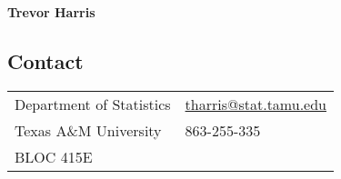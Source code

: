\documentclass[11pt]{article}
\title{\vspace{-0.9in}}
\author{\LARGE \textbf{Trevor Harris}}
\begin{document}
\thispagestyle{empty}

\begin{center}
{\LARGE \textbf{Trevor Harris}}
\end{center}

\subsection*{Contact}
\vspace{-0.6cm}\noindent\hrulefill
\vspace{-0.2cm}

\begin{table}[H]
\hspace{-3.7mm}
\begin{tabular}{ll}
Department of Statistics  &  \hspace{8cm} \href{mailto:tharris@stat.tamu.edu}{\color{blue} {tharris@stat.tamu.edu}} \\

Texas A\&M University   &  \hspace{8cm}  863-255-335  \\

BLOC 415E

\end{tabular}
\end{table}


%
\end{document}
